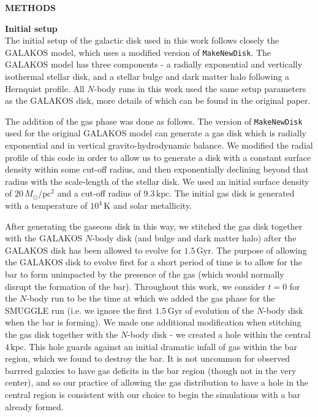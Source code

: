 \documentclass[twoside]{natureprintstyle}
\newcommand{\Nbody}{$N$-body}
\begin{document}

\FloatBarrier
\clearpage

\setcounter{page}{1}
\setcounter{figure}{0}
\setcounter{table}{0}
\renewcommand{\figurename}{Extended Data Figure}
\renewcommand{\thetable}{Extended Data \arabic{table}}

\noindent
{\bf \Large \uppercase{Methods} }

\bigskip

\noindent
{\bf Initial setup}
\\
\noindent
The initial setup of the galactic disk used in this work follows closely the
GALAKOS model\cite{2020ApJ...890..117D}, which uses a modified version of
\texttt{MakeNewDisk}.\cite{2005MNRAS.361..776S} The GALAKOS model has three
components - a radially exponential and vertically isothermal stellar disk,
and a stellar bulge and dark matter halo following a Hernquist
profile.\cite{1990ApJ...356..359H} All \Nbody{} runs in this work used the same
setup parameters as the GALAKOS disk, more details of which can be found in
the original paper.

The addition of the gas phase was done as follows. The version of
\texttt{MakeNewDisk} used for the original GALAKOS model can generate a gas
disk which is radially exponential and in vertical gravito-hydrodynamic
balance. We modified the radial profile of this code in order to allow us to
generate a disk with a constant surface density within some cut-off radius,
and then exponentially declining beyond that radius with the scale-length of
the stellar disk. We used an initial surface density of
$20\,M_{\odot}/\textrm{pc}^2$ and a cut-off radius of $9.3\,\textrm{kpc}$. The
initial gas disk is generated with a temperature of $10^4\,\textrm{K}$ and
solar metallicity.

After generating the gaseous disk in this way, we stitched the gas disk
together with the GALAKOS \Nbody{} disk (and bulge and dark matter halo) after
the GALAKOS disk has been allowed to evolve for $1.5\,\textrm{Gyr}$. The
purpose of allowing the GALAKOS disk to evolve first for a short period of
time is to allow for the bar to form unimpacted by the presence of the gas
(which would normally disrupt the formation of the bar). Throughout this work,
we consider $t=0$ for the \Nbody{} run to be the time at which we added the
gas phase for the SMUGGLE run (i.e. we ignore the first $1.5\,\textrm{Gyr}$ of
evolution of the \Nbody{} disk when the bar is forming). We made one
additional modification when stitching the gas disk together with the \Nbody{}
disk - we created a hole within the central $4\,\textrm{kpc}$. This hole
guards against an initial dramatic infall of gas within the bar region, which
we found to destroy the bar. It is not uncommon for observed barrred galaxies
to have gas deficits in the bar region (though not in the very
center),\cite{1993RPPh...56..173S} and so our practice of allowing the gas
distribution to have a hole in the central region is consistent with our
choice to begin the simulations with a bar already formed.
\end{document}
